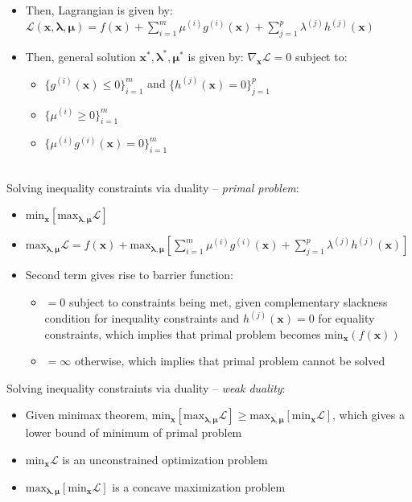 \begin{itemize}
    \item Then, Lagrangian is given by: $\mathcal{L}(\boldsymbol{x},\boldsymbol{\lambda},\boldsymbol{\mu}) = f(\boldsymbol{x}) + \sum_{i=1}^m \mu^{(i)} g^{(i)}(\boldsymbol{x}) + \sum_{j=1}^p \lambda^{(j)} h^{(j)}(\boldsymbol{x})$
    \item Then, general solution $\boldsymbol{x^*},\boldsymbol{\lambda^*},\boldsymbol{\mu^*}$ is given by: $\nabla_{\boldsymbol{x}} \mathcal{L} = 0$ subject to:
    \begin{itemize}
        \item $\{g^{(i)}(\boldsymbol{x}) \leq 0\}_{i=1}^m$ and $\{h^{(j)}(\boldsymbol{x}) = 0\}_{j=1}^p$ 
        \item $\{\mu^{(i)} \geq 0\}_{i=1}^m$
        \item $\{\mu^{(i)}g^{(i)}(\boldsymbol{x}) = 0\}_{i=1}^m$
    \end{itemize}
\end{itemize}\\
Solving inequality constraints via duality – \emph{primal problem}:
\begin{itemize}
    \item $\textrm{min}_{\boldsymbol{x}} [\textrm{max}_{\boldsymbol{\lambda},\boldsymbol{\mu}} \mathcal{L}]$
    \item $\textrm{max}_{\boldsymbol{\lambda},\boldsymbol{\mu}} \mathcal{L} = f(\boldsymbol{x}) + \textrm{max}_{\boldsymbol{\lambda},\boldsymbol{\mu}} [\sum_{i=1}^m \mu^{(i)} g^{(i)}(\boldsymbol{x}) + \sum_{j=1}^p \lambda^{(j)} h^{(j)}(\boldsymbol{x})]$
    \item Second term gives rise to barrier function:
    \begin{itemize}
        \item $= 0$ subject to constraints being met, given complementary slackness condition for inequality constraints and $h^{(j)}(\boldsymbol{x}) = 0$ for equality constraints, which implies that primal problem becomes $\textrm{min}_{\boldsymbol{x}}(f(\boldsymbol{x}))$
        \item $= \infty$ otherwise, which implies that primal problem cannot be solved
    \end{itemize}
\end{itemize}
Solving inequality constraints via duality – \emph{weak duality}:
\begin{itemize}
    \item Given minimax theorem, $\textrm{min}_{\boldsymbol{x}} [\textrm{max}_{\boldsymbol{\lambda},\boldsymbol{\mu}} \mathcal{L}] \geq \textrm{max}_{\boldsymbol{\lambda},\boldsymbol{\mu}} [\textrm{min}_{\boldsymbol{x}} \mathcal{L}]$, which gives a lower bound of minimum of primal problem
    \item $\textrm{min}_{\boldsymbol{x}} \mathcal{L}$ is an unconstrained optimization problem 
    \item $\textrm{max}_{\boldsymbol{\lambda},\boldsymbol{\mu}} [\textrm{min}_{\boldsymbol{x}} \mathcal{L}]$ is a concave maximization problem 
\end{itemize}
